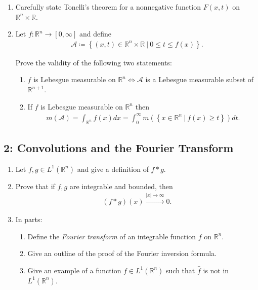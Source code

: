 \begin{enumerate}
\def\labelenumi{\alph{enumi}.}
\item
  Carefully state Tonelli's theorem for a nonnegative function
  \(F(x, t)\) on \({\mathbb{R}}^n\times{\mathbb{R}}\).
\item
  Let \(f:{\mathbb{R}}^n\to [0, \infty]\) and define
  \begin{align*}
  {\mathcal{A}}\coloneqq\left\{{(x, t) \in {\mathbb{R}}^n\times{\mathbb{R}}{~\mathrel{\Big|}~}0\leq t \leq f(x)}\right\}
  .\end{align*}

  Prove the validity of the following two statements:

  \begin{enumerate}
  \def\labelenumii{\arabic{enumii}.}
  \tightlist
  \item
    \(f\) is Lebesgue measurable on
    \({\mathbb{R}}^{n} \iff {\mathcal{A}}\) is a Lebesgue measurable
    subset of \({\mathbb{R}}^{n+1}\).
  \item
    If \(f\) is Lebesgue measurable on \({\mathbb{R}}^n\) then
    \begin{align*}
    m(\mathcal{A})=\int_{\mathbb{R}^{n}} f(x) d x=\int_{0}^{\infty} m\left(\left\{x \in \mathbb{R}^{n}{~\mathrel{\Big|}~}f(x) \geq t\right\}\right) d t
    .\end{align*}
  \end{enumerate}
\end{enumerate}

\hypertarget{convolutions-and-the-fourier-transform}{%
\subsection{2: Convolutions and the Fourier
Transform}\label{convolutions-and-the-fourier-transform}}

\begin{enumerate}
\def\labelenumi{\alph{enumi}.}
\item
  Let \(f, g\in L^1({\mathbb{R}}^n)\) and give a definition of
  \(f\ast g\).
\item
  Prove that if \(f, g\) are integrable and bounded, then
  \begin{align*}
  (f\ast g)(x) \overset{{\left\lvert {x} \right\rvert}\to\infty}\to 0
  .\end{align*}
\item
  In parts:

  \begin{enumerate}
  \def\labelenumii{\arabic{enumii}.}
  \tightlist
  \item
    Define the \emph{Fourier transform} of an integrable function \(f\)
    on \({\mathbb{R}}^n\).
  \item
    Give an outline of the proof of the Fourier inversion formula.
  \item
    Give an example of a function \(f\in L^1({\mathbb{R}}^n)\) such that
    \(\widehat{f}\) is not in \(L^1({\mathbb{R}}^n)\).
  \end{enumerate}
\end{enumerate}


